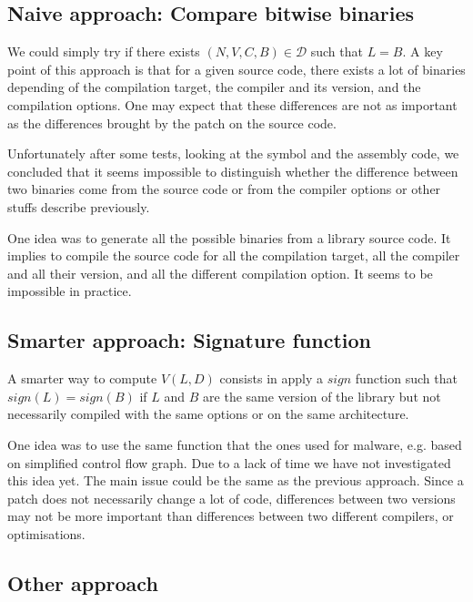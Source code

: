\documentclass{article}
\newcommand{\signature}{{sign}}
\begin{document}

    \subsection{Naive approach: Compare bitwise binaries }
    \label{naive-notations}
    We could simply try if there exists $(N, V, C, B) \in  \mathcal{D}$ such that $L = B$. A key point of this approach is that for a given source code, there exists a lot of binaries depending of the compilation target, the compiler and its version, and the compilation options. One may expect that these differences are not as important as the differences brought by the patch on the source code.

    Unfortunately after some tests, looking at the symbol and the assembly code, we concluded that it seems impossible to distinguish whether the difference between two binaries come from the source code or from the compiler options or other stuffs describe previously.
    
    One idea was to generate all the possible binaries from a library source code. It implies to compile the source code for all the compilation target, all the compiler and all their version, and all the different compilation option. It seems to be impossible in practice.


    \subsection{Smarter approach: Signature function}\label{approach-sign}
    A smarter way to compute $V(L,D)$ consists in apply a $\signature$ function such that $\signature(L) = \signature(B)$ if $L$ and $B$ are the same version of the library but not necessarily compiled with the same options or on the same architecture.
	
	One idea was to use the same function that the ones used for malware, e.g. based on simplified control flow graph. Due to a lack of time we have not investigated this idea yet. The main issue could be the same as the previous approach. Since a patch does not necessarily change a lot of code, differences between two versions may not be more important than differences between two different compilers, or optimisations.
	
	\subsection{Other approach}
	
\end{document}
